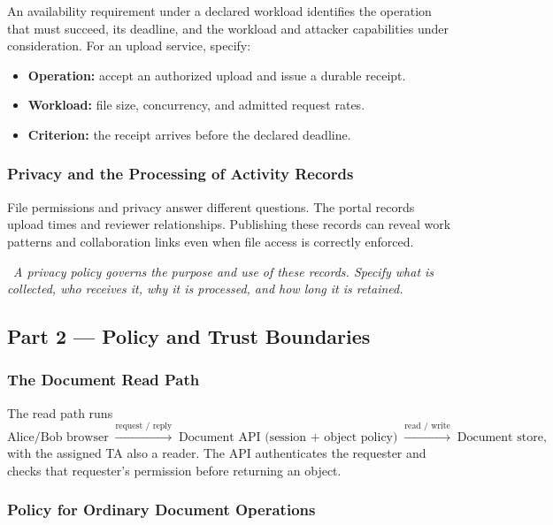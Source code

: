 \documentclass[hidelinks]{article}
\newcommand{\callout}[1]{\par\smallskip\noindent{\color{capri}$\blacktriangleright$}\ \textit{#1}\par\smallskip}
\begin{document}
An availability requirement under a declared workload identifies the operation that must succeed, its deadline, and the workload and attacker capabilities under consideration. For an upload service, specify:
\begin{itemize}
    \item \textbf{Operation:} accept an authorized upload and issue a durable receipt.
    \item \textbf{Workload:} file size, concurrency, and admitted request rates.
    \item \textbf{Criterion:} the receipt arrives before the declared deadline.
\end{itemize}

\subsubsection{Privacy and the Processing of Activity Records}

File permissions and privacy answer different questions. The portal records upload times and reviewer relationships. Publishing these records can reveal work patterns and collaboration links even when file access is correctly enforced.

\callout{A privacy policy governs the purpose and use of these records. Specify what is collected, who receives it, why it is processed, and how long it is retained.}

\subsection{Part 2 --- Policy and Trust Boundaries}

\subsubsection{The Document Read Path}

The read path runs
\[
\text{Alice/Bob browser} \;\xrightarrow{\text{request / reply}}\;
\text{Document API (session + object policy)} \;\xrightarrow{\text{read / write}}\;
\text{Document store},
\]
with the assigned TA also a reader. The API authenticates the requester and checks that requester's permission before returning an object.

\subsubsection{Policy for Ordinary Document Operations}
\end{document}
